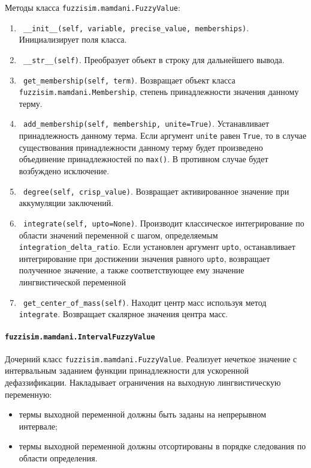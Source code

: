 Методы класса \lstinline!fuzzisim.mamdani.FuzzyValue!:
\begin{enumerate}[label=\arabic*)]
	\item \lstinline! __init__(self, variable, precise_value, memberships)!. Инициализирует поля класса.
	\item \lstinline! __str__(self)!.   Преобразует объект в строку для дальнейшего вывода.
	\item \lstinline! get_membership(self, term)!. Возвращает объект класса \lstinline!fuzzisim.mamdani.Membership!, степень принадлежности значения данному терму.
	\item \lstinline! add_membership(self, membership, unite=True)!. Устанавливает принадлежность данному терма. Если аргумент \lstinline!unite! равен \lstinline!True!, то в случае существования принадлежности данному терму будет произведено объединение принадлежностей по \lstinline!max()!. В противном случае будет возбуждено исключение.
	\item \lstinline! degree(self, crisp_value)!.  Возвращает активированное значение при аккумуляции заключений.
	\item \lstinline! integrate(self, upto=None)!. Производит классическое интегрирование по области значений переменной с шагом, определяемым \lstinline!integration_delta_ratio!. Если установлен аргумент \lstinline!upto!, останавливает интегрирование при достижении значения равного \lstinline!upto!, возвращает полученное значение, а также соответствующее ему значение лингвистической переменной
	\item \lstinline! get_center_of_mass(self)!. Находит центр масс используя метод \lstinline!integrate!. Возвращает скалярное значения центра масс.
\end{enumerate}




\paragraph{\lstinline!fuzzisim.mamdani.IntervalFuzzyValue!}

Дочерний класс \lstinline!fuzzisim.mamdani.FuzzyValue!. Реализует нечеткое значение с интервальным заданием функции принадлежности для ускоренной дефаззификации. Накладывает ограничения на выходную лингвистическую переменную:

\begin{itemize}
	\item термы выходной переменной должны быть заданы на непрерывном интервале;
	\item термы выходной переменной должны отсортированы в порядке следования по области определения.
\end{itemize}

